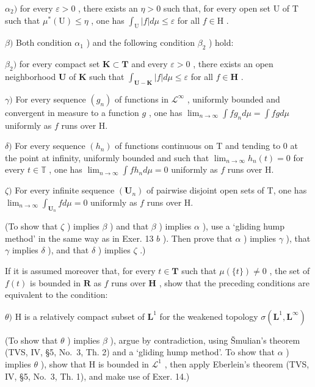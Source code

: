 \(\alpha_{2})\) for every \(\varepsilon > 0\) , there exists an \(\eta > 0\) such that, for every open set U of T such that \(\mu^{*}(\mathrm{U}) \leqslant \eta\) , one has \(\int_{\mathrm{U}} |f| d\mu \leqslant \varepsilon\) for all \(f \in \mathrm{H}\) .

\(\beta)\) Both condition \(\alpha_{1}\) ) and the following condition \(\beta_{2}\) ) hold:

\(\beta_{2})\) for every compact set \(\mathbf{K} \subset \mathbf{T}\) and every \(\varepsilon > 0\) , there exists an open neighborhood \(\mathbf{U}\) of \(\mathbf{K}\) such that \(\int_{\mathbf{U} - \mathbf{K}} |f| d\mu \leqslant \varepsilon\) for all \(f \in \mathbf{H}\) .

\(\gamma)\) For every sequence \((g_n)\) of functions in \(\mathcal{L}^{\infty}\) , uniformly bounded and convergent in measure to a function \(g\) , one has \(\lim_{n\to \infty}\int fg_n d\mu = \int fg d\mu\) uniformly as \(f\) runs over H.

\(\delta)\) For every sequence \((h_n)\) of functions continuous on T and tending to 0 at the point at infinity, uniformly bounded and such that \(\lim_{n\to \infty}h_n(t) = 0\) for every \(t\in \mathbb{T}\) , one has \(\lim_{n\to \infty}\int fh_n d\mu = 0\) uniformly as \(f\) runs over H.

\(\zeta)\) For every infinite sequence \((\mathbf{U}_n)\) of pairwise disjoint open sets of T, one has \(\lim_{n\to \infty}\int_{\mathbf{U}_n}f d\mu = 0\) uniformly as \(f\) runs over H.

(To show that \(\zeta\) ) implies \(\beta\) ) and that \(\beta\) ) implies \(\alpha\) ), use a `gliding hump method' in the same way as in Exer. 13 \(b\) ). Then prove that \(\alpha\) ) implies \(\gamma\) ), that \(\gamma\) implies \(\delta\) ), and that \(\delta\) ) implies \(\zeta\) .)

If it is assumed moreover that, for every \(t \in \mathbf{T}\) such that \(\mu(\{t\}) \neq 0\) , the set of \(f(t)\) is bounded in \(\mathbf{R}\) as \(f\) runs over \(\mathbf{H}\) , show that the preceding conditions are equivalent to the condition:

\(\theta)\) H is a relatively compact subset of \(\mathbf{L}^1\) for the weakened topology \(\sigma (\mathbf{L}^{1},\mathbf{L}^{\infty})\)

(To show that \(\theta\) ) implies \(\beta\) ), argue by contradiction, using Šmulian's theorem (TVS, IV, §5, No.~3, Th. 2) and a `gliding hump method'. To show that \(\alpha\) ) implies \(\theta\) ), show that H is bounded in \(\mathcal{L}^1\) , then apply Eberlein's theorem (TVS, IV, §5, No.~3, Th. 1), and make use of Exer. 14.)

